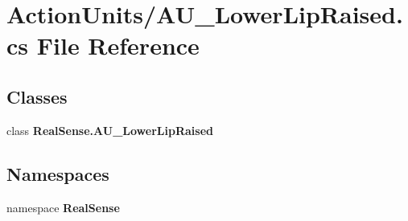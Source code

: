 \section{Action\+Units/\+A\+U\+\_\+\+Lower\+Lip\+Raised.cs File Reference}
\label{_a_u___lower_lip_raised_8cs}
\subsection*{Classes}
\begin{DoxyCompactItemize}
\item 
class \textbf{ Real\+Sense.\+A\+U\+\_\+\+Lower\+Lip\+Raised}
\end{DoxyCompactItemize}
\subsection*{Namespaces}
\begin{DoxyCompactItemize}
\item 
namespace \textbf{ Real\+Sense}
\end{DoxyCompactItemize}
